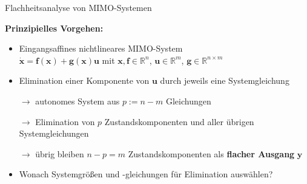 \documentclass[
	ngerman,
	10pt,				%
	aspectratio=169 	%
]{beamer}
\begin{document}

\begin{frame}[t,fragile,label=Flachheit_2]{\large Flachheitsanalyse von MIMO-Systemen}
	
	\textbf{Prinzipielles Vorgehen:}
	
	\begin{itemize}
		\pause
		\item  Eingangsaffines nichtlineares MIMO-System\\
		$\dot{\mathbf{x}} = \mathbf{f}(\mathbf{x}) + \mathbf{g}(\mathbf{x}) \mathbf{u}$ \quad mit \quad $\mathbf{x}, \mathbf{f} \in \mathbb{R}^n$, $\mathbf{u} \in \mathbb{R}^m$, $\mathbf{g} \in \mathbb{R}^{n \times m}$
		\pause
		\bigskip
		\item Elimination einer Komponente von $\mathbf{u}$ durch jeweils eine Systemgleichung
		\pause
		\item[$\rightarrow$] autonomes System aus $p := n - m$ Gleichungen
		\pause
		\item[$\rightarrow$] Elimination von $p$ Zustandskomponenten und aller übrigen Systemgleichungen
		\pause
		\item[$\rightarrow$] übrig bleiben $n - p = m $ Zustandskomponenten als \textbf{flacher Ausgang} $\mathbf{y}$
		\pause
		\bigskip
		\item Wonach Systemgrößen und -gleichungen für Elimination auswählen?
	\end{itemize}
	
\end{frame}

\end{document}
